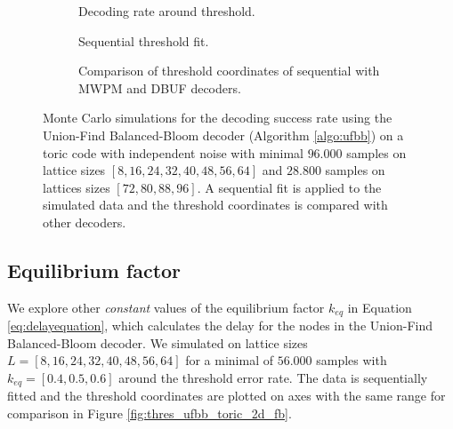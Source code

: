 \begin{figure}[htbp]
  \centering
  \begin{subfigure}[b]{0.49\textwidth}
    \begin{adjustbox}{Clip=0 1em 0 0}
      
    \end{adjustbox}
    \caption{Decoding rate around threshold.}\label{fig:thres_ufbb_toric_2d_data}
  \end{subfigure}
  \begin{subfigure}[b]{0.49\textwidth}
    \begin{adjustbox}{Clip=0 1em 0 0}
      
    \end{adjustbox}
    \caption{Sequential threshold fit.}\label{fig:thres_ufbb_toric_2d_seq}
  \end{subfigure}
  \begin{subfigure}[b]{\textwidth}
    \begin{adjustbox}{Clip=0 1em 0 0}
    
    \end{adjustbox}
    \caption{Comparison of threshold coordinates of sequential with MWPM and DBUF decoders.}\label{fig:thres_ufbb_toric_2d_comp}
  \end{subfigure}
  \caption{Monte Carlo simulations for the decoding success rate using the Union-Find Balanced-Bloom decoder (Algorithm \ref{algo:ufbb}) on a toric code with independent noise with minimal $96.000$ samples on lattice sizes $[8, 16, 24, 32, 40, 48, 56, 64]$ and $28.800$ samples on lattices sizes $[72, 80, 88, 96]$. A sequential fit is applied to the simulated data and the threshold coordinates is compared with other decoders.}
  \label{fig:thres_ufbb_toric_2d}
\end{figure}


\subsection{Equilibrium factor}

We explore other \emph{constant} values of the equilibrium factor $k_{eq}$ in Equation \eqref{eq:delayequation}, which calculates the delay for the nodes in the Union-Find Balanced-Bloom decoder. We simulated on lattice sizes $L=[8, 16, 24, 32, 40, 48, 56, 64]$ for a minimal of $56.000$ samples with $k_{eq} = [0.4, 0.5, 0.6]$ around the threshold error rate. The data is sequentially fitted and the threshold coordinates are plotted on axes with the same range for comparison in Figure \ref{fig:thres_ufbb_toric_2d_fb}. 

